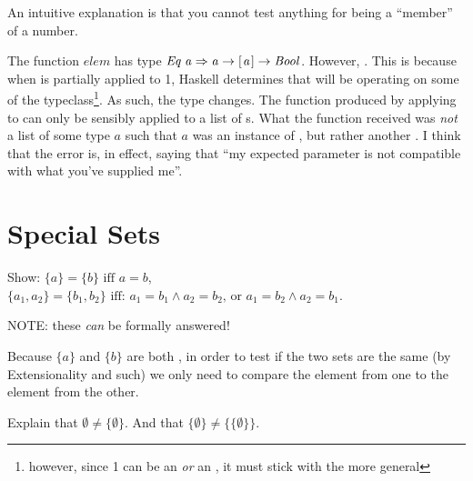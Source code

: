 \documentclass{report}
\newcommand{\Conid}[1]{\mathit{#1}}
\newcommand{\Varid}[1]{\mathit{#1}}
\begin{document}
\begin{Answer}
  An intuitive explanation is that you cannot test anything for 
  being a ``member'' of a number.

  The function \ensuremath{\Varid{elem}} has type \ensuremath{\Conid{Eq}\;\Varid{a}\Rightarrow \Varid{a}\to [\mskip1.5mu \Varid{a}\mskip1.5mu]\to \Conid{Bool}}.
  However, . This is because
  when  is partially applied to 1, Haskell determines that
   will be operating on some  of the 
  typeclass\footnote{however, since 1 can be an  \emph{or} an , it must stick with the more general }. 
  As such, the type changes. The function produced by applying
   to  can only be sensibly applied to a list of s.
  What the function received was \emph{not} a list of some type \ensuremath{\Varid{a}} such
  that \ensuremath{\Varid{a}} was an instance of , but rather another . I think that
  the error is, in effect, saying that ``my expected parameter is not compatible
  with what you've supplied me''.
  
\end{Answer}
\section{Special Sets}

\begin{Exercise} [number=10]
  Show:
  \Question $\{ a \} = \{ b \} \textrm{ iff } a = b$,
  \Question $\{ a_1, a_2 \} = \{ b_1, b_2 \} \textrm{ iff: } a_1 = b_1 \land a_2 = b_2 \textrm{, or } a_1 = b_2 \land a_2 = b_1$.

  NOTE: these \emph{can} be formally answered!
\end{Exercise}

\begin{Answer} [number=10.1]
  Because $\{ a \}$ and $\{ b \}$ are both , in order
  to test if the two sets are the same (by Extensionality and such) we
  only need to compare the element from one to the element from the
  other.
\end{Answer}

\begin{Exercise} [number=11]
  Explain that $\emptyset \neq \{\emptyset\}$. And that $\lbrace
  \emptyset \rbrace \neq \bigl\{\{ \emptyset \}\bigr\}$.
\end{Exercise}
\end{document}
